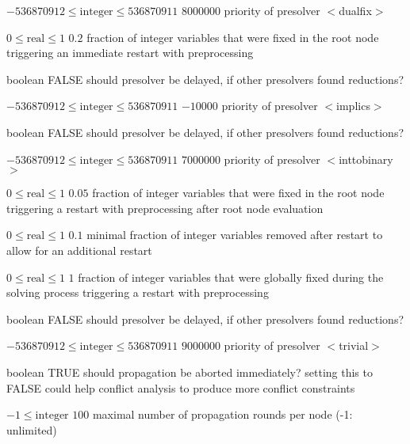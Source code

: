 %
{$-536870912\leq\textrm{integer}\leq536870911$}%
{$8000000$}%
{priority of presolver $<$dualfix$>$}%
{}

%
{$0\leq\textrm{real}\leq1$}%
{$0.2$}%
{fraction of integer variables that were fixed in the root node triggering an immediate restart with preprocessing}%
{}

%
{boolean}%
{FALSE}%
{should presolver be delayed, if other presolvers found reductions?}%
{}

%
{$-536870912\leq\textrm{integer}\leq536870911$}%
{$-10000$}%
{priority of presolver $<$implics$>$}%
{}

%
{boolean}%
{FALSE}%
{should presolver be delayed, if other presolvers found reductions?}%
{}

%
{$-536870912\leq\textrm{integer}\leq536870911$}%
{$7000000$}%
{priority of presolver $<$inttobinary$>$}%
{}

%
{$0\leq\textrm{real}\leq1$}%
{$0.05$}%
{fraction of integer variables that were fixed in the root node triggering a restart with preprocessing after root node evaluation}%
{}

%
{$0\leq\textrm{real}\leq1$}%
{$0.1$}%
{minimal fraction of integer variables removed after restart to allow for an additional restart}%
{}

%
{$0\leq\textrm{real}\leq1$}%
{$1$}%
{fraction of integer variables that were globally fixed during the solving process triggering a restart with preprocessing}%
{}

%
{boolean}%
{FALSE}%
{should presolver be delayed, if other presolvers found reductions?}%
{}

%
{$-536870912\leq\textrm{integer}\leq536870911$}%
{$9000000$}%
{priority of presolver $<$trivial$>$}%
{}

%
{boolean}%
{TRUE}%
{should propagation be aborted immediately? setting this to FALSE could help conflict analysis to produce more conflict constraints}%
{}

%
{$-1\leq\textrm{integer}$}%
{$100$}%
{maximal number of propagation rounds per node (-1: unlimited)}%
{}

